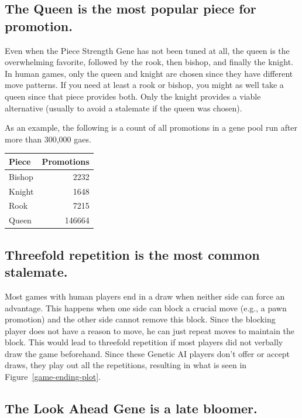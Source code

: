\documentclass[letterpaper]{article}
\renewcommand{\_}{\allowbreak\textunderscore\allowbreak}
\begin{document}
\subsection{The Queen is the most popular piece for promotion.}

Even when the Piece Strength Gene has not been tuned at all, the queen is the overwhelming favorite, followed by the rook, then bishop, and finally the knight. In human games, only the queen and knight are chosen since they have different move patterns. If you need at least a rook or bishop, you might as well take a queen since that piece provides both. Only the knight provides a viable alternative (usually to avoid a stalemate if the queen was chosen).

As an example, the following is a count of all promotions in a gene pool run after more than 300,000 gaes.
\begin{center}
\begin{tabular}{l|r}
	Piece & Promotions \\
\hline
	Bishop & 2232  \\
	Knight  &  1648 \\
	Rook    &  7215 \\
	Queen  & 146664 \\
\end{tabular}
\end{center}


\subsection{Threefold repetition is the most common stalemate.}

Most games with human players end in a draw when neither side can force an advantage. This happens when one side can block a crucial move (e.g., a pawn promotion) and the other side cannot remove this block. Since the blocking player does not have a reason to move, he can just repeat moves to maintain the block. This would lead to threefold repetition if most players did not verbally draw the game beforehand. Since these Genetic AI players don't offer or accept draws, they play out all the repetitions, resulting in what is seen in Figure~\ref{game-ending-plot}.

\subsection{The Look Ahead Gene is a late bloomer.}
\end{document}
